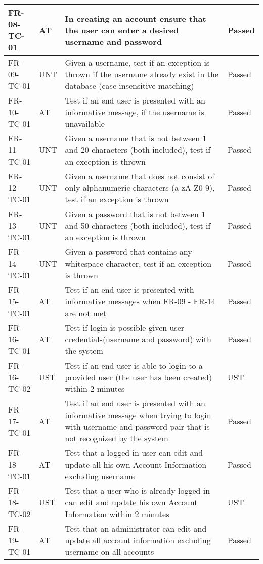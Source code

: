 \documentclass[../report.tex]{subfiles}
\begin{document}
\begin{longtable}{|L{2.1cm}|L{1cm}|L{12.4cm}|L{1.4cm}|}
FR-08-TC-01&AT&In creating an account ensure that the user can enter a desired username and password&Passed  \\ \hline
FR-09-TC-01&UNT&Given a username, test if an exception is thrown if the username already exist in the database (case insensitive matching)&Passed  \\ \hline
FR-10-TC-01&AT&Test if an end user is presented with an informative message, if the username is unavailable&Passed  \\ \hline
FR-11-TC-01&UNT&Given a username that is not between 1 and 20 characters (both included), test if an exception is thrown&Passed  \\ \hline
FR-12-TC-01&UNT&Given a username that does not consist of only alphanumeric characters (a-zA-Z0-9), test if an exception is thrown&Passed  \\ \hline
FR-13-TC-01&UNT&Given a password that is not between 1 and 50 characters (both included), test if an exception is thrown&Passed  \\ \hline
FR-14-TC-01&UNT&Given a password that contains any whitespace character, test if an exception is thrown&Passed  \\ \hline
FR-15-TC-01&AT&Test if an end user is presented with informative messages when FR-09 - FR-14 are not met&Passed  \\ \hline
FR-16-TC-01&AT&Test if login is possible given user credentials(username and password) with the system&Passed  \\ \hline
FR-16-TC-02&UST&Test if an end user is able to login to a provided user (the user has been created) within 2 minutes&UST  \\ \hline
FR-17-TC-01&AT&Test if an end user is presented with an informative message when trying to login with username and password pair that is not recognized by the system&Passed  \\ \hline
FR-18-TC-01&AT&Test that a logged in user can edit and update all his own Account Information excluding username&Passed  \\ \hline
FR-18-TC-02&UST&Test that a user who is already logged in can edit and update his own Account Information within 2 minutes&UST  \\ \hline
FR-19-TC-01&AT&Test that an administrator can edit and update all account information excluding username on all accounts&Passed  \\ \hline

\end{longtable}
\end{document}
